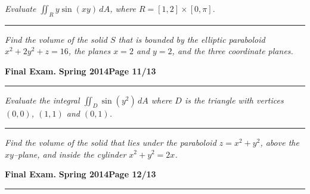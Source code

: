 \documentclass[12pt]{article}
\begin{document}
\bigskip
{\problem[15 pts] \em  Evaluate $\iint_R y \sin(xy)\, dA$, where
  $R=[1,2] \times [0,\pi]$.}
\vspace{8cm}
\begin{flushright}
\end{flushright}
\hrule
{\problem[15 pts] \em Find the volume of the solid $S$ that is bounded
  by the elliptic paraboloid $x^2+2y^2+z=16$, the planes $x=2$ and
  $y=2$, and the three coordinate planes.}
\vspace{9cm}
\begin{flushright}
\end{flushright}
\newpage

\hfill{\large\bf Final Exam.}\hfill{\large\bf
  Spring 2014}\hfill{\large\bf Page 11/13}\hrule

\bigskip
{\problem[15 pts] \em Evaluate the integral $\iint_D \sin(y^2)\, dA$
  where $D$ is the triangle with vertices $(0,0)$, $(1,1)$ and
  $(0,1)$.}
\vspace{8cm}
\begin{flushright}
\end{flushright}
\hrule
{\problem[10 pts] \em Find the volume of the solid that lies under the
  paraboloid $z=x^2+y^2$, above the $xy$--plane, and inside the
  cylinder $x^2+y^2=2x$.}
\vspace{8cm}
\begin{flushright}
\end{flushright}
\newpage

\hfill{\large\bf Final Exam.}\hfill{\large\bf
  Spring 2014}\hfill{\large\bf Page 12/13}\hrule
\end{document}
